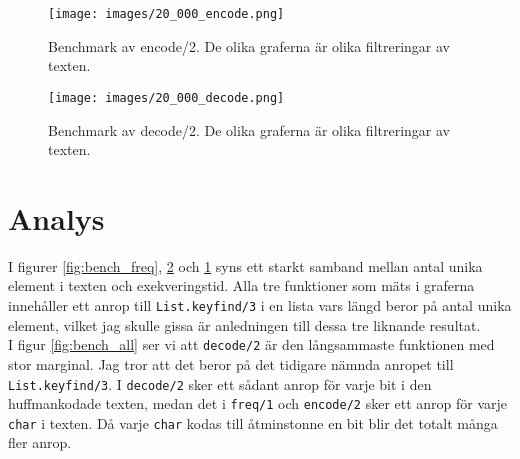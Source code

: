 \documentclass[a4paper,11pt]{article}
\begin{document}
\begin{figure}[H]
  \begin{centering}
    \texttt{[image: images/20\_000\_encode.png]}
    \caption{Benchmark av encode/2. De olika graferna är olika filtreringar av texten.}
    \label{fig:bench_encode}
  \end{centering}
\end{figure}

\begin{figure}[H]
  \begin{centering}
    \texttt{[image: images/20\_000\_decode.png]}
    \caption{Benchmark av decode/2. De olika graferna är olika filtreringar av texten.}
    \label{fig:bench_decode}
  \end{centering}
\end{figure}

\section*{Analys}
I figurer \ref{fig:bench_freq}, \ref{fig:bench_decode} och \ref{fig:bench_encode} syns ett starkt samband mellan antal unika element i texten och exekveringstid. Alla tre funktioner som mäts i graferna innehåller ett anrop till {\tt List.keyfind/3} i en lista vars längd beror på antal unika element, vilket jag skulle gissa är anledningen till dessa tre liknande resultat.\\
I figur \ref{fig:bench_all} ser vi att {\tt decode/2} är den långsammaste funktionen med stor marginal. Jag tror att det beror på det tidigare nämnda anropet till {\tt List.keyfind/3}. I {\tt decode/2} sker ett sådant anrop för varje bit i den huffmankodade texten, medan det i {\tt freq/1} och {\tt encode/2} sker ett anrop för varje {\tt char} i texten. Då varje {\tt char} kodas till åtminstonne en bit blir det totalt många fler anrop.
\end{document}

